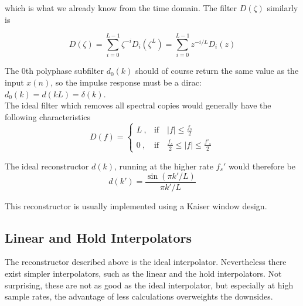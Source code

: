 which is what we already know from the time domain. The filter $D(\zeta)$
similarly is

\begin{equation*}
	D(\zeta) = \sum\limits_{i=0}^{L-1} \zeta^{-i} D_i(\zeta^L)
	= \sum\limits_{i=0}^{L-1} z^{-i/L} D_i(z)
\end{equation*}

The 0th polyphase subfilter $d_0(k)$ should of course return the same value as
the input $x(n)$, so the impulse response must be a dirac:
$d_0(k) = d(kL) = \delta(k)$. \\

The ideal filter which removes all spectral copies would generally have
the following characteristics
\begin{equation*}
	D(f) = \begin{cases}
		L\:,	& \text{if} \quad |f|\leq\frac{f_s}{2} \\
		0\:,	& \text{if} \quad \frac{f_s}{2}\leq |f|\leq\frac{f'_s}{2}
	\end{cases}
\end{equation*}

The ideal reconstructor $d(k)$, running at the higher rate $f_s'$ would
therefore be
\begin{equation*}
	d(k') = \frac{\sin(\pi k' / L)}{\pi k' / L}
\end{equation*}

This reconstructor is usually implemented using a Kaiser window design.

\subsection{Linear and Hold Interpolators}
The reconstructor described above is the ideal interpolator. Nevertheless
there exist simpler interpolators, such as the linear and the hold interpolators.
Not surprising, these are not as good as the ideal interpolator, but especially
at high sample rates, the advantage of less calculations overweights the
downsides.

